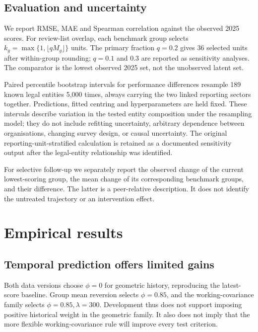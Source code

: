 \documentclass[11pt,letterpaper]{article}
\begin{document}
\subsection{Evaluation and uncertainty}
We report RMSE, MAE and Spearman correlation against the observed 2025 scores. For review-list overlap, each benchmark group selects $k_g=\max\{1,\lfloor qM_g\rfloor\}$ units. The primary fraction $q=0.2$ gives 36 selected units after within-group rounding; $q=0.1$ and $0.3$ are reported as sensitivity analyses. The comparator is the lowest observed 2025 set, not the unobserved latent set.

Paired percentile bootstrap intervals for performance differences resample 189 known legal entities 5,000 times, always carrying the two linked reporting sectors together. Predictions, fitted centring and hyperparameters are held fixed. These intervals describe variation in the tested entity composition under the resampling model; they do not include refitting uncertainty, arbitrary dependence between organisations, changing survey design, or causal uncertainty. The original reporting-unit-stratified calculation is retained as a documented sensitivity output after the legal-entity relationship was identified.

For selective follow-up we separately report the observed change of the current lowest-scoring group, the mean change of its corresponding benchmark groups, and their difference. The latter is a peer-relative description. It does not identify the untreated trajectory or an intervention effect.

\section{Empirical results}
\subsection{Temporal prediction offers limited gains}
Both data versions choose $\phi=0$ for geometric history, reproducing the latest-score baseline. Group mean reversion selects $\phi=0.85$, and the working-covariance family selects $\phi=0.85,\lambda=300$. Development thus does not support imposing positive historical weight in the geometric family. It also does not imply that the more flexible working-covariance rule will improve every test criterion.

\begin{table}[t]
\centering\small\setlength{\tabcolsep}{4pt}

\caption{Final 2025 results using archived historical predictor vintages. Overlap is against the future \emph{observed} within-group bottom set. Intervals concern the RMSE difference from the latest-score rule and use the paired 189-entity bootstrap with fixed fitted predictions. Negative differences favour the listed rule.}
\label{tab:vintage}
\end{table}
\end{document}
